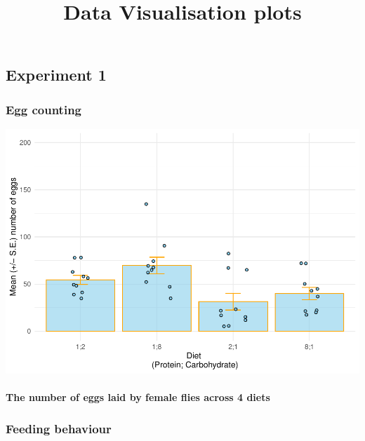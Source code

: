 \documentclass[
]{article}
\title{Data Visualisation plots}
\author{}
\date{\vspace{-2.5em}}
\begin{document}
\maketitle

\hypertarget{experiment-1}{%
\subsection{Experiment 1}\label{experiment-1}}

\hypertarget{egg-counting}{%
\subsubsection{Egg counting}\label{egg-counting}}

\includegraphics{Drosophila-project_files/figure-latex/unnamed-chunk-2-1.pdf}

\hypertarget{the-number-of-eggs-laid-by-female-flies-across-4-diets}{%
\paragraph{The number of eggs laid by female flies across 4
diets}\label{the-number-of-eggs-laid-by-female-flies-across-4-diets}}

\hypertarget{feeding-behaviour}{%
\subsubsection{Feeding behaviour}\label{feeding-behaviour}}
\end{document}
